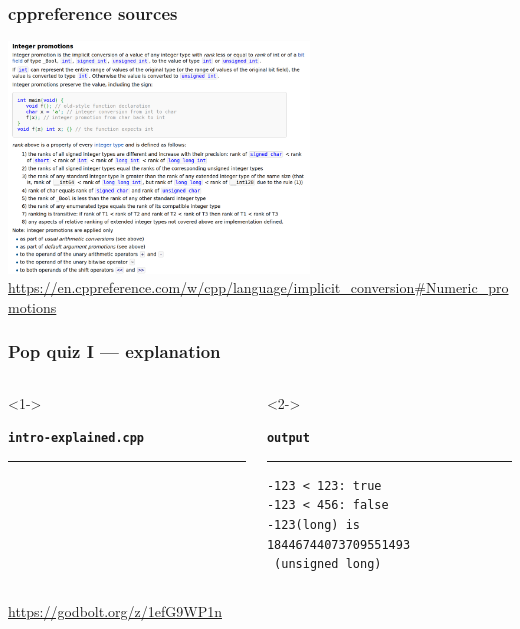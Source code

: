 \documentclass[aspectratio=169]{beamer}
\begin{document}
\begin{frame}[fragile]
\frametitle{cppreference sources}
\begin{center}
\includegraphics[width=0.6\textwidth]{pictures/cppreference-integer-promotions.png}
\vspace*{12pt}
{\footnotesize \url{https://en.cppreference.com/w/cpp/language/implicit\_conversion#Numeric\_promotions}}
\end{center}
\end{frame}

\begin{frame}[fragile]
\frametitle{Pop quiz I --- explanation}
\begin{columns}[T]
  \begin{column}{0.7\textwidth}<1->
    {\color[HTML]{cb4b16}
    \texttt{\textbf{intro-explained.cpp}}\vspace{-9pt}
    \rule{\linewidth}{2pt}}%
    {\fontsize{4}{4} }%
    \vspace{-12pt}{\color[HTML]{cb4b16}\rule{\linewidth}{2pt}}%
  \end{column}
  \begin{column}{0.25\textwidth}<2->
    {\color[HTML]{002b36}
    \texttt{\textbf{output}}\vspace{-9pt}
    \rule{\linewidth}{2pt}}%
    {\fontsize{8}{6} \begin{lstlisting}[showstringspaces=false]
-123 < 123: true
-123 < 456: false
-123(long) is
18446744073709551493
 (unsigned long)
    \end{lstlisting}
    }
    \vspace{-12pt}{\color[HTML]{002b36}\rule{\linewidth}{2pt}}%
  \end{column}
\end{columns}
\pause{}
\begin{center}\url{https://godbolt.org/z/1efG9WP1n}\end{center}
\end{frame}
\end{document}
